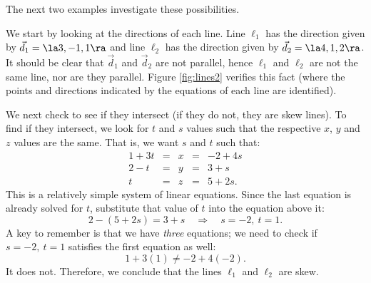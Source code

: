 The next two examples investigate these possibilities.\\

{We start by looking at the directions of each line. Line $\ell_1$ has the direction given by $\vec d_1=\la 3,-1,1\ra$ and line $\ell_2$ has the direction given by $\vec d_2 = \la 4,1,2\ra$. It should be clear that $\vec d_1$ and $\vec d_2$ are not parallel, hence $\ell_1$ and $\ell_2$ are not the same line, nor are they parallel. Figure \ref{fig:lines2} verifies this fact (where the points and directions indicated by the equations of each line are identified).

We next check to see if they intersect (if they do not, they are skew lines). To find if they intersect, we look for $t$ and $s$ values such that the respective $x$, $y$ and $z$ values are the same. That is, we want $s$ and $t$ such that:
\[
\begin{array}{ccccc}
1+3t &=&x&=&-2+4s\\
2-t&=&y&=&3+s\\
t&=&z&=&5+2s.
\end{array}
\]
This is a relatively simple system of linear equations. Since the last equation is already solved for $t$, substitute that value of $t$ into the equation above it:
\[
2-(5+2s) = 3+s \quad \Rightarrow \quad s=-2,\ t=1.
\]
A key to remember is that we have \emph{three} equations; we need to check if $s=-2,\ t=1$ satisfies the first equation as well:
\[
1+3(1) \neq -2+4(-2).
\]
It does not. Therefore, we conclude that the lines $\ell_1$ and $\ell_2$ are skew.
}\\

